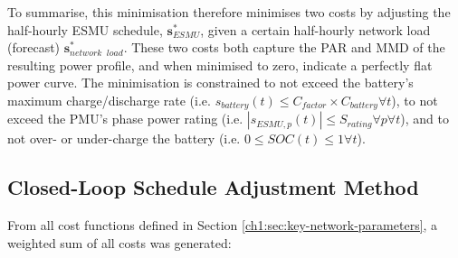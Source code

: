 

To summarise, this minimisation therefore minimises two costs by adjusting the half-hourly ESMU schedule, $\textbf{s}^*_{ESMU}$, given a certain half-hourly network load (forecast) $\textbf{s}^*_{network\;\;load}$.
These two costs both capture the PAR and MMD of the resulting power profile, and when minimised to zero, indicate a perfectly flat power curve.
The minimisation is constrained to not exceed the battery's maximum charge/discharge rate (i.e. $s_{battery}(t) \leq C_{factor} \times C_{battery} \forall t$), to not exceed the PMU's phase power rating (i.e. $\left|s_{ESMU,p}(t)\right| \leq S_{rating} \forall p \forall t$), and to not over- or under-charge the battery (i.e. $0 \leq SOC(t) \leq 1 \forall t$).

\subsection{Closed-Loop Schedule Adjustment Method}

From all cost functions defined in Section \ref{ch1:sec:key-network-parameters}, a weighted sum of all costs was generated:


